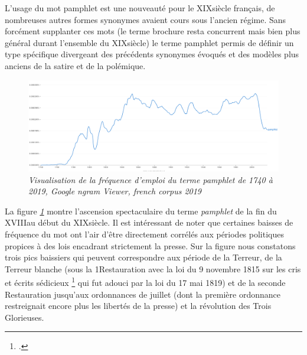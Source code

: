 L'usage du mot pamphlet est une nouveauté pour le XIX\ieme siècle français, de nombreuses autres formes synonymes avaient cours sous l'ancien régime. Sans forcément supplanter ces mots (le terme brochure resta concurrent mais bien plus général durant l'ensemble du XIX\ieme siècle) le terme pamphlet permis de définir un type spécifique divergeant des précédents synonymes évoqués et des modèles plus anciens de la satire et de la polémique. 

\begin{figure}[H]
\centering %
\includegraphics[width=1\textwidth]{img/google_ngramviewer_pamphlet_french_2019.png}
\caption{\textit{Visualisation de la fréquence d'emploi du terme pamphlet de 1740 à 2019, Google ngram Viewer, french corpus 2019}}
\label{fig:googlengram}
\end{figure}

La figure \textit{\ref{fig:googlengram}} montre l'ascension spectaculaire du terme \textit{pamphlet} de la fin du XVIII\ieme au début du XIX\ieme siècle. Il est intéressant de noter que certaines baisses de fréquence du mot ont l'air d'être directement corrélés aux périodes politiques propices à des lois encadrant strictement la presse. Sur la figure nous constatons trois pics baissiers qui peuvent correspondre aux période de la Terreur, de la Terreur blanche (sous la 1\iere Restauration avec la loi du 9 novembre 1815 sur les cris et écrits sédicieux \footcites{quensoi_de_la_hennerie_les_1925} qui fut adouci par la loi du 17 mai 1819) et de la seconde Restauration jusqu'aux ordonnances de juillet (dont la première ordonnance restreignait encore plus les libertés de la presse) et la révolution des Trois Glorieuses.

